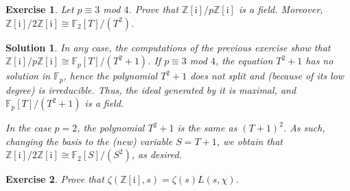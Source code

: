 \documentclass{article}
\newtheorem{ex}{Exercise}
\theoremstyle{nonumberplain}
\newtheorem{sol}{Solution}
\newcommand{\Z}{\mathbb{Z}}
\newcommand{\FF}{\mathbb{F}}
\newcommand{\I}{\mathrm{i}}
\begin{document}
\begin{ex}
Let $p \equiv 3$ mod $4$. Prove that $\Z[\I] / p \Z[\I]$ is a field. Moreover, $\Z[\I]/2 \Z[\I] \cong \FF_2[T]/(T^2)$.
\end{ex}

\begin{sol}
In any case, the computations of the previous exercise show that $\Z[\I] / p \Z[\I] \cong \FF_p[T]/(T^2 + 1)$. If $p \equiv 3$ mod $4$, the equation $T^2 + 1$ has no solution in $\FF_p$, hence the polynomial $T^2 + 1$ does not split and (because of its low degree) is irreducible. Thus, the ideal generated by it is maximal, and $\FF_p[T]/(T^2 + 1)$ is a field.

In the case $p = 2$, the polynomial $T^2 + 1$ is the same as $(T+1)^2$. As such, changing the basis to the (new) variable $S = T+1$, we obtain that $\Z[\I]/2\Z[\I] \cong \FF_2[S]/(S^2)$, as desired.
\end{sol}

\begin{ex}
Prove that $\zeta(\Z[\I], s) = \zeta(s) L(s,\chi)$.
\end{ex}
\end{document}
